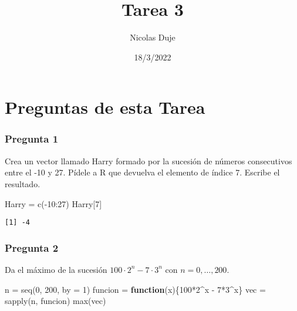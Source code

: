 \documentclass[
]{article}
\title{Tarea 3}
\author{Nicolas Duje}
\date{18/3/2022}
\newenvironment{Shaded}{\begin{snugshade}}{\end{snugshade}}
\newcommand{\AttributeTok}[1]{\textcolor[rgb]{0.77,0.63,0.00}{#1}}
\newcommand{\ControlFlowTok}[1]{\textcolor[rgb]{0.13,0.29,0.53}{\textbf{#1}}}
\newcommand{\DecValTok}[1]{\textcolor[rgb]{0.00,0.00,0.81}{#1}}
\newcommand{\FunctionTok}[1]{\textcolor[rgb]{0.00,0.00,0.00}{#1}}
\newcommand{\NormalTok}[1]{#1}
\newcommand{\OtherTok}[1]{\textcolor[rgb]{0.56,0.35,0.01}{#1}}
\newcommand{\SpecialCharTok}[1]{\textcolor[rgb]{0.00,0.00,0.00}{#1}}
\begin{document}
\maketitle

\hypertarget{preguntas-de-esta-tarea}{%
\section{Preguntas de esta Tarea}\label{preguntas-de-esta-tarea}}

\hypertarget{pregunta-1}{%
\subsubsection{Pregunta 1}\label{pregunta-1}}

Crea un vector llamado Harry formado por la sucesión de números
consecutivos entre el -10 y 27. Pídele a R que devuelva el elemento de
índice 7. Escribe el resultado.

\begin{Shaded}
\begin{Highlighting}[]
\NormalTok{Harry }\OtherTok{=} \FunctionTok{c}\NormalTok{(}\SpecialCharTok{{-}}\DecValTok{10}\SpecialCharTok{:}\DecValTok{27}\NormalTok{)}
\NormalTok{Harry[}\DecValTok{7}\NormalTok{]}
\end{Highlighting}
\end{Shaded}

\begin{verbatim}
[1] -4
\end{verbatim}

\hypertarget{pregunta-2}{%
\subsubsection{Pregunta 2}\label{pregunta-2}}

Da el máximo de la sucesión \(100\cdot 2^n -7\cdot3^n\) con
\(n=0,\dots,200\).

\begin{Shaded}
\begin{Highlighting}[]
\NormalTok{n }\OtherTok{=} \FunctionTok{seq}\NormalTok{(}\DecValTok{0}\NormalTok{, }\DecValTok{200}\NormalTok{, }\AttributeTok{by =} \DecValTok{1}\NormalTok{)}
\NormalTok{funcion }\OtherTok{=} \ControlFlowTok{function}\NormalTok{(x)\{}\DecValTok{100}\SpecialCharTok{*}\DecValTok{2}\SpecialCharTok{\^{}}\NormalTok{x }\SpecialCharTok{{-}} \DecValTok{7}\SpecialCharTok{*}\DecValTok{3}\SpecialCharTok{\^{}}\NormalTok{x\}}
\NormalTok{vec }\OtherTok{=} \FunctionTok{sapply}\NormalTok{(n, funcion)}
\FunctionTok{max}\NormalTok{(vec)}
\end{Highlighting}
\end{Shaded}
\end{document}
